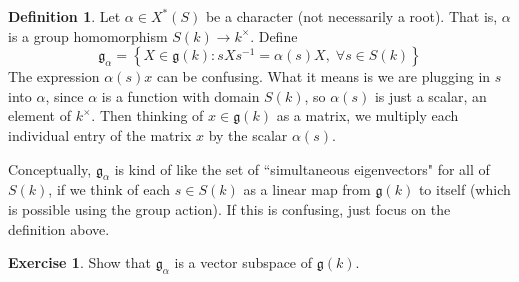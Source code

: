 \documentclass[12pt]{article}
\theoremstyle{definition}
\newtheorem{definition}[theorem]{Definition}
\newtheorem{exercise}[theorem]{Exercise}
\newcommand{\lb}{\left\{}
\newcommand{\rb}{\right\}}
\newcommand{\inv}{^{-1}}
\newcommand{\frakg}{\mathfrak{g}}
\begin{document}
\begin{definition}
Let $\alpha \in X^*(S)$ be a character (not necessarily a root). That is, $\alpha$ is a group homomorphism $S(k) \to k^\times$. Define
\[
	\frakg_\alpha = \lb X \in \frakg(k) : sXs \inv = \alpha(s) X, \; \forall s \in S(k) \rb
\]
The expression $\alpha(s) x$ can be confusing. What it means is we are plugging in $s$ into $\alpha$, since $\alpha$ is a function with domain $S(k)$, so $\alpha(s)$ is just a scalar, an element of $k^\times$. Then thinking of $x \in \frakg(k)$ as a matrix, we multiply each individual entry of the matrix $x$ by the scalar $\alpha(s)$.

Conceptually, $\frakg_\alpha$ is kind of like the set of ``simultaneous eigenvectors" for all of $S(k)$, if we think of each $s \in S(k)$ as a linear map from $\frakg(k)$ to itself (which is possible using the group action). If this is confusing, just focus on the definition above.
\end{definition}

\begin{exercise}
Show that $\frakg_\alpha$ is a vector subspace of $\frakg(k)$. 
\end{exercise}
\end{document}
